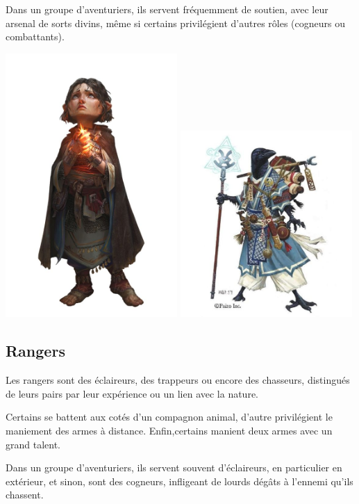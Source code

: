\documentclass[10pt,a4paper]{book}
\begin{document}
Dans un groupe d'aventuriers, ils servent fréquemment de soutien, avec leur arsenal de sorts divins, même si certains privilégient d'autres rôles (cogneurs ou combattants).

\includegraphics[width=0.49\textwidth]{oracle 1}
\includegraphics[width=0.49\textwidth]{oracle 2}
\subsection{Rangers}
Les rangers sont des éclaireurs, des trappeurs ou encore des chasseurs, distingués de leurs pairs par leur expérience ou un lien avec la nature. 

Certains se battent aux cotés d'un compagnon animal, d'autre privilégient le maniement des armes à distance. Enfin,certains manient deux armes avec un grand talent.

Dans un groupe d'aventuriers, ils servent souvent d'éclaireurs, en particulier en extérieur, et sinon, sont des cogneurs, infligeant de lourds dégâts à l'ennemi qu'ils chassent.
\end{document}
